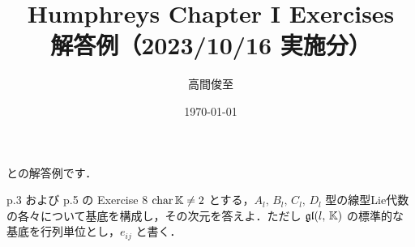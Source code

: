 \documentclass{ltjsarticle}
\theoremstyle{mystyle} %
\numberwithin{equation}{section}
\begin{document}
\title{Humphreys Chapter I Exercises \\ 解答例（2023/10/16 実施分）}
\author{高間俊至}
\date{\today}
\maketitle

\setcounter{section}{1}

\cite[p.5, Exercise 8]{Humphreys1972introduction}と\cite[p.14, Exercise 2]{Humphreys1972introduction}の解答例です．

\begin{myproblem}[label=ex:1-1-8]{p.3 および p.5 の Exercise 8}
    $\operatorname{char} \mathbb{K} \neq 2$ とする，$A_l,\, B_l,\, C_l,\, D_l$ 型の線型Lie代数の各々について基底を構成し，その次元を答えよ．ただし $\mathfrak{gl}(l,\, \mathbb{K})$ の標準的な基底を行列単位とし，$e_{ij}$ と書く．
\end{myproblem}
\end{document}
